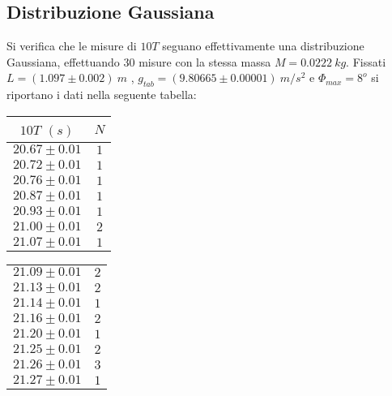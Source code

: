 \documentclass[12pt, a4paper]{article}
\begin{document}
\subsection{Distribuzione Gaussiana}
Si verifica che le misure di $10T$ seguano effettivamente una distribuzione Gaussiana, effettuando 30 misure con la stessa massa $M=0.0222 \ kg$.
Fissati $L=(1.097\pm 0.002)\ m$ , $g_{tab}=(9.80665\pm 0.00001)\ m/s^2$ e $\Phi_{max}=8^o$ si riportano i dati nella seguente tabella: 


\begin{table}[!htb]
    \begin{minipage}[t]{.3\linewidth}
    \centering
        \begin{tabular}{|c|c|}
            \hline
            $10T$ $(s)$&$N$\\
            \hline
            $20.67\pm 0.01$ & $1$\\
            $20.72\pm 0.01$ & $1$\\
            $20.76\pm 0.01$ & $1$\\
            $20.87\pm 0.01$ & $1$\\
            $20.93\pm 0.01$ & $1$\\
            $21.00\pm 0.01$ & $2$\\
            $21.07\pm 0.01$ & $1$\\
            \hline
        \end{tabular}
    \end{minipage}
    \begin{minipage}[t]{.3\linewidth}
    \centering
        \begin{tabular}{|c|c|}
            \hline
            
            $21.09\pm 0.01$ & $2$\\
            $21.13\pm 0.01$ & $2$\\
            $21.14\pm 0.01$ & $1$\\
            $21.16\pm 0.01$ & $2$\\
            $21.20\pm 0.01$ & $1$\\
            $21.25\pm 0.01$ & $2$\\
            $21.26\pm 0.01$ & $3$\\
            $21.27\pm 0.01$ & $1$\\
            \hline
        \end{tabular}
    \end{minipage}
    \begin{minipage}[t]{.3\linewidth}
    \centering
        \begin{tabular}{|c|c|}
            \hline
            

\end{tabular}
\end{minipage}
\end{table}
\end{document}
